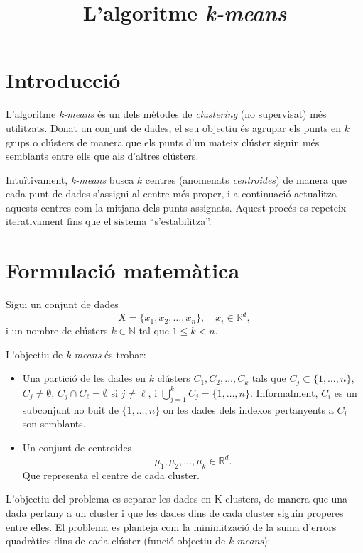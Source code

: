 \documentclass[a4paper,11pt]{article}
\title{L'algoritme \textit{k-means}}
\author{}
\date{}
\begin{document}
\maketitle

\section{Introducció}

L'algoritme \textit{k-means} és un dels mètodes de \emph{clustering}
(no supervisat) més utilitzats.
Donat un conjunt de dades, el seu objectiu és agrupar els punts en $k$
grups o clústers de manera que els punts d'un mateix clúster siguin
més semblants entre ells que als d'altres clústers.

Intuïtivament, \textit{k-means} busca $k$ centres (anomenats \emph{centroides})
de manera que cada punt de dades s’assigni al centre més proper,
i a continuació actualitza aquests centres com la mitjana dels punts
assignats. Aquest procés es repeteix iterativament fins que el sistema
``s'estabilitza''.

\section{Formulació matemàtica}

Sigui un conjunt de dades
\[
  X = \{x_1, x_2, \dots, x_n\}, \quad x_i \in \mathbb{R}^d,
\]
i un nombre de clústers $k \in \mathbb{N}$ tal que $1 \leq k < n$.

L'objectiu de \textit{k-means} és trobar:

\begin{itemize}
  \item Una partició de les dades en $k$ clústers $C_1, C_2, \dots, C_k$
        tals que $C_j \subset \{1,\dots,n\}$, $C_j \neq \emptyset$,
        $C_j \cap C_\ell = \emptyset$ si $j \neq \ell$, i 
        $\bigcup_{j=1}^k C_j = \{1,\dots,n\}$. Informalment, $C_i$ es
		un subconjunt no buit de $\{1,\dots,n\}$ on les dades
		dels indexos pertanyents a $C_i$ son semblants.
  \item Un conjunt de centroides
        \[
          \mu_1, \mu_2, \dots, \mu_k \in \mathbb{R}^d.
        \]
	Que representa el centre de cada cluster.
\end{itemize}

L'objectiu del problema es separar les dades en K clusters, de manera que
una dada pertany a un cluster i que les dades dins de cada cluster siguin properes
entre elles. El problema es planteja com la minimització de la suma d'errors
quadràtics dins de cada clúster (funció objectiu de \textit{k-means}):
\end{document}

